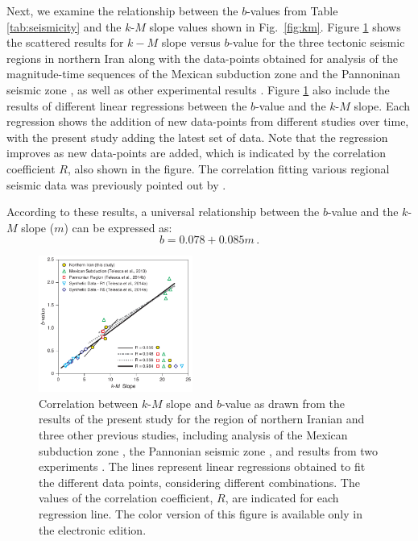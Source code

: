 Next, we examine the relationship between the $b$-values from Table \ref{tab:seismicity} and the $k$-$M$ slope values shown in Fig.~\ref{fig:km}. Figure \ref{fig:regression} shows the scattered results for $k-M$ slope versus $b$-value for the three tectonic seismic regions in northern Iran along with the data-points obtained for analysis of the magnitude-time sequences of the Mexican subduction zone \citep{Telesca2013} and the Pannoninan seismic zone \citep{Telesca2014}, as well as other experimental results \citep{Telesca2014-pone}. Figure \ref{fig:regression} also include the results of different linear regressions between the $b$-value and the $k$-$M$ slope. Each regression shows the addition of new data-points from different studies over time, with the present study adding the latest set of data. Note that the regression improves as new data-points are added, which is indicated by the correlation coefficient $R$, also shown in the figure. The correlation fitting various regional seismic data was previously pointed out by \citet{Telesca2014}. 

According to these results, a universal relationship between the $b$-value and the $k$-$M$ slope ($m$) can be expressed as:
% 
\begin{equation}
	b = 0.078 + 0.085 m \, .
	\label{eq:universal.bm}
\end{equation}

\begin{figure}[h]%
	\centering
	\includegraphics[width=0.45\textwidth]{figures/pdf/figure-07} 
	\caption{Correlation between $k$-$M$ slope and $b$-value as drawn from the results of the present study for the region of northern Iranian and three other previous studies, including analysis of the Mexican subduction zone \citep{Telesca2013}, the Pannonian seismic zone \citep{Telesca2014}, and results from two experiments \citep{Telesca2014-pone}. The lines represent linear regressions obtained to fit the different data points, considering different combinations. The values of the correlation coefficient, $R$, are indicated for each regression line. The color version of this figure is available only in the electronic edition.}
	\label{fig:regression}
\end{figure}


